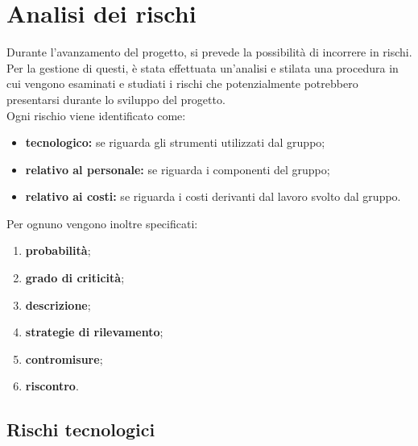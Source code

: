 \section{Analisi dei rischi}
Durante l'avanzamento del progetto, si prevede la possibilità di incorrere in rischi. Per la gestione di questi, è stata effettuata un'analisi e stilata una procedura in cui vengono esaminati e studiati i rischi che potenzialmente potrebbero presentarsi durante lo sviluppo del progetto. \\
Ogni rischio viene identificato come:
\begin{itemize}
\item \textbf{tecnologico:} se riguarda gli strumenti utilizzati dal gruppo;
\item \textbf{relativo al personale:} se riguarda i componenti del gruppo;
\item \textbf{relativo ai costi:} se riguarda i costi derivanti dal lavoro svolto dal gruppo.
\end{itemize}
Per ognuno vengono inoltre specificati:
\begin{enumerate}
	\item \textbf{probabilità};
	\item \textbf{grado di criticità};
	\item \textbf{descrizione};
	\item \textbf{strategie di rilevamento};
	\item \textbf{contromisure};
	\item \textbf{riscontro}.
\end{enumerate}


\subsection{Rischi tecnologici}
